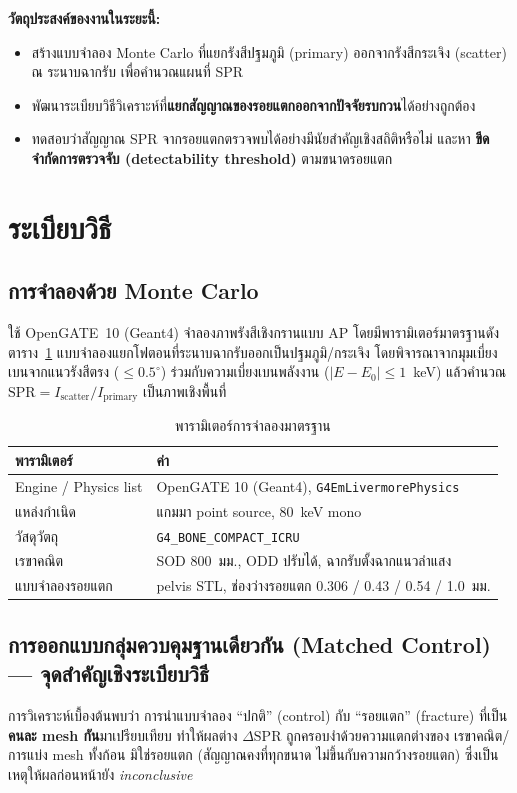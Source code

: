 \documentclass[14pt]{extarticle}
\begin{document}
\noindent\textbf{วัตถุประสงค์ของงานในระยะนี้:}
\begin{itemize}
  \item สร้างแบบจำลอง Monte Carlo ที่แยกรังสีปฐมภูมิ (primary) ออกจากรังสีกระเจิง (scatter)
        ณ ระนาบฉากรับ เพื่อคำนวณแผนที่ SPR
  \item พัฒนาระเบียบวิธีวิเคราะห์ที่\textbf{แยกสัญญาณของรอยแตกออกจากปัจจัยรบกวน}ได้อย่างถูกต้อง
  \item ทดสอบว่าสัญญาณ SPR จากรอยแตกตรวจพบได้อย่างมีนัยสำคัญเชิงสถิติหรือไม่ และหา
        \textbf{ขีดจำกัดการตรวจจับ (detectability threshold)} ตามขนาดรอยแตก
\end{itemize}

\section{ระเบียบวิธี}

\subsection{การจำลองด้วย Monte Carlo}
ใช้ OpenGATE~10 (Geant4) จำลองภาพรังสีเชิงกรานแบบ AP โดยมีพารามิเตอร์มาตรฐานดังตาราง~\ref{tab:sim}
แบบจำลองแยกโฟตอนที่ระนาบฉากรับออกเป็นปฐมภูมิ/กระเจิง โดยพิจารณาจากมุมเบี่ยงเบนจากแนวรังสีตรง
($\le 0.5^\circ$) ร่วมกับความเบี่ยงเบนพลังงาน ($|E-E_0|\le 1$~keV) แล้วคำนวณ
$\mathrm{SPR}=I_{\text{scatter}}/I_{\text{primary}}$ เป็นภาพเชิงพื้นที่

\begin{table}[h]\centering
\caption{พารามิเตอร์การจำลองมาตรฐาน}\label{tab:sim}
\small
\begin{tabular}{ll}
\toprule
\textbf{พารามิเตอร์} & \textbf{ค่า} \\
\midrule
Engine / Physics list & OpenGATE 10 (Geant4), \texttt{G4EmLivermorePhysics} \\
แหล่งกำเนิด & แกมมา point source, 80~keV mono \\
วัสดุวัตถุ & \texttt{G4\_BONE\_COMPACT\_ICRU} \\
เรขาคณิต & SOD 800~มม., ODD ปรับได้, ฉากรับตั้งฉากแนวลำแสง \\
แบบจำลองรอยแตก & pelvis STL, ช่องว่างรอยแตก 0.306 / 0.43 / 0.54 / 1.0~มม. \\
\bottomrule
\end{tabular}
\end{table}

\subsection{การออกแบบกลุ่มควบคุมฐานเดียวกัน (Matched Control) --- จุดสำคัญเชิงระเบียบวิธี}
การวิเคราะห์เบื้องต้นพบว่า การนำแบบจำลอง ``ปกติ'' (control) กับ ``รอยแตก'' (fracture) ที่เป็น
\textbf{คนละ mesh กัน}มาเปรียบเทียบ ทำให้ผลต่าง $\Delta\mathrm{SPR}$ ถูกครอบงำด้วยความแตกต่างของ
เรขาคณิต/การแบ่ง mesh ทั้งก้อน มิใช่รอยแตก (สัญญาณคงที่ทุกขนาด ไม่ขึ้นกับความกว้างรอยแตก)
ซึ่งเป็นเหตุให้ผลก่อนหน้ายัง \textit{inconclusive}
\end{document}
